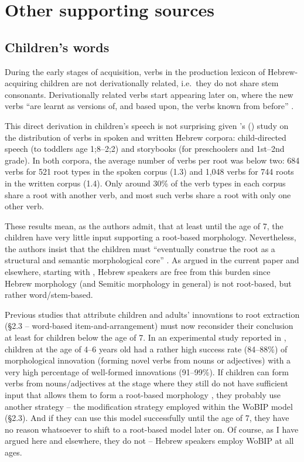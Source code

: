 \documentclass[output=paper,
modfonts
]{LSP/langsci}
\begin{document}
\section{Other supporting sources}\label{other-supporting-sources}
\subsection{Children's words}
During the early
stages of acquisition, verbs in the production lexicon of
Hebrew-acquiring children are not derivationally related, i.e.\ they do
not share stem consonants. Derivationally related verbs start appearing
later on, where the new verbs ``are learnt as versions of, and based
upon, the verbs known from before'' \citep[62]{berman1988a}.

This direct derivation in children's speech is not surprising given
\citeauthor{ravid2016a}'s (\citeyear{ravid2016a}) study on the distribution of verbs in spoken and
written Hebrew corpora: child-directed speech (to toddlers age 1;8--2;2)
and storybooks (for preschoolers and
1st--2nd grade). In both corpora,
the average number of verbs per root was below two: 684 verbs for 521
root types in the spoken corpus (1.3) and 1,048 verbs for 744 roots in
the written corpus (1.4). Only around 30\% of the verb types in each
corpus share a root with another verb, and most such verbs share a root
with only one other verb.

These results mean, as the authors admit, that at least until the age of
7, the children have very little input supporting a root-based
morphology. Nevertheless, the authors insist that the children must
``eventually construe the root as a structural and semantic
morphological core'' \citep[126]{ravid2016a}. As argued in the current
paper and elsewhere, starting with \citet{Batel1994}, Hebrew speakers are
free from this burden since Hebrew morphology (and Semitic morphology in
general) is not root-based, but rather word/stem-based.

Previous studies that attribute children and adults' innovations to root
extraction (§2.3 -- word-based item-and-arrangement) must now reconsider
their conclusion at least for children below the age of 7. In an
experimental study reported in \citet{berman2003a}, children at the age of
4--6 years old had a rather high success rate (84--88\%) of morphological
innovation (forming novel verbs from nouns or adjectives) with a very
high percentage of well-formed innovations (91--99\%). If children can
form verbs from nouns/adjectives at the stage where they still do not
have sufficient input that allows them to form a root-based morphology
\citep{ravid2016a}, they probably use another strategy -- the
modification strategy employed within the WoBIP model (§2.3). And if
they can use this model successfully until the age of 7, they have no
reason whatsoever to shift to a root-based model later on. Of course, as
I have argued here and elsewhere, they do not -- Hebrew speakers employ
WoBIP at all ages.
\end{document}
